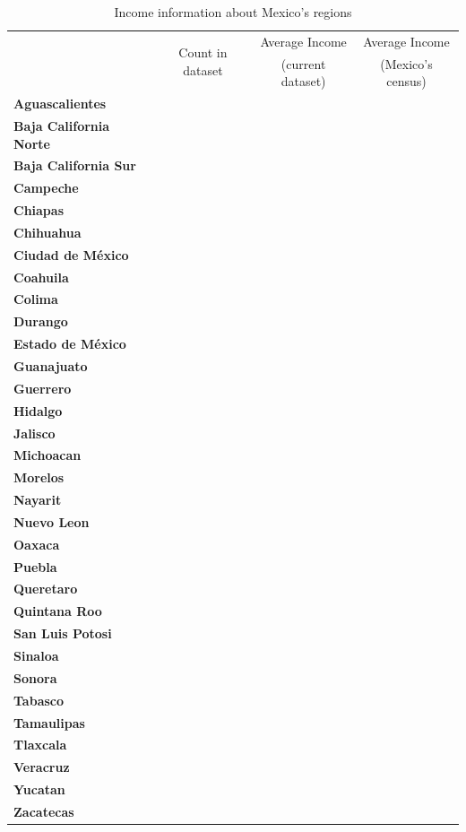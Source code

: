 \begin{table}[p]
\centering
\begin{tabular}{>{\bfseries}l c c c}
\toprule
\multirow{2}{*}{State} & \multirow{2}{*}{Count in dataset} & Average Income & Average Income \\
& & (current dataset) & (Mexico's census) \\
\midrule
Aguascalientes & & & \\
Baja California Norte & & & \\
Baja California Sur & & & \\
Campeche & & & \\
Chiapas & & & \\
Chihuahua & & & \\
Ciudad de México & & & \\
Coahuila & & & \\
Colima & & & \\
Durango & & & \\
Estado de México & & & \\
Guanajuato & & & \\
Guerrero & & & \\
Hidalgo & & & \\
Jalisco & & & \\
Michoacan & & & \\
Morelos & & & \\
Nayarit & & & \\
Nuevo Leon & & & \\
Oaxaca & & & \\
Puebla & & & \\
Queretaro & & & \\
Quintana Roo & & & \\
San Luis Potosi & & & \\
Sinaloa & & & \\
Sonora & & & \\
Tabasco & & & \\
Tamaulipas & & & \\
Tlaxcala & & & \\
Veracruz & & & \\
Yucatan & & & \\
Zacatecas & & & \\
\bottomrule
\end{tabular}
\caption{Income information about Mexico's regions}
\label{tab:regions}
\end{table}

